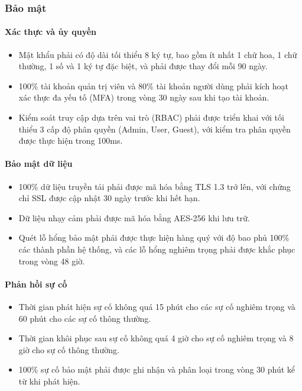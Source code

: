 \subsubsection{Bảo mật}

\paragraph{Xác thực và ủy quyền}
\begin{itemize}
    \item Mật khẩu phải có độ dài tối thiểu 8 ký tự, bao gồm ít nhất 1 chữ hoa, 1 chữ thường, 1 số và 1 ký tự đặc biệt, và phải được thay đổi mỗi 90 ngày. 
    \item 100\% tài khoản quản trị viên và 80\% tài khoản người dùng phải kích hoạt xác thực đa yếu tố (MFA) trong vòng 30 ngày sau khi tạo tài khoản.
    \item Kiểm soát truy cập dựa trên vai trò (RBAC) phải được triển khai với tối thiểu 3 cấp độ phân quyền (Admin, User, Guest), với kiểm tra phân quyền được thực hiện trong 100ms.
\end{itemize}

\paragraph{Bảo mật dữ liệu}
\begin{itemize}
    \item 100\% dữ liệu truyền tải phải được mã hóa bằng TLS 1.3 trở lên, với chứng chỉ SSL được cập nhật 30 ngày trước khi hết hạn.
    \item Dữ liệu nhạy cảm phải được mã hóa bằng AES-256 khi lưu trữ.
    \item Quét lỗ hổng bảo mật phải được thực hiện hàng quý với độ bao phủ 100\% các thành phần hệ thống, và các lỗ hổng nghiêm trọng phải được khắc phục trong vòng 48 giờ.
\end{itemize}

\paragraph{Phản hồi sự cố}
\begin{itemize}
    \item Thời gian phát hiện sự cố không quá 15 phút cho các sự cố nghiêm trọng và 60 phút cho các sự cố thông thường. 
    \item Thời gian khôi phục sau sự cố không quá 4 giờ cho sự cố nghiêm trọng và 8 giờ cho sự cố thông thường. 
    \item 100\% sự cố bảo mật phải được ghi nhận và phân loại trong vòng 30 phút kể từ khi phát hiện.
\end{itemize}

